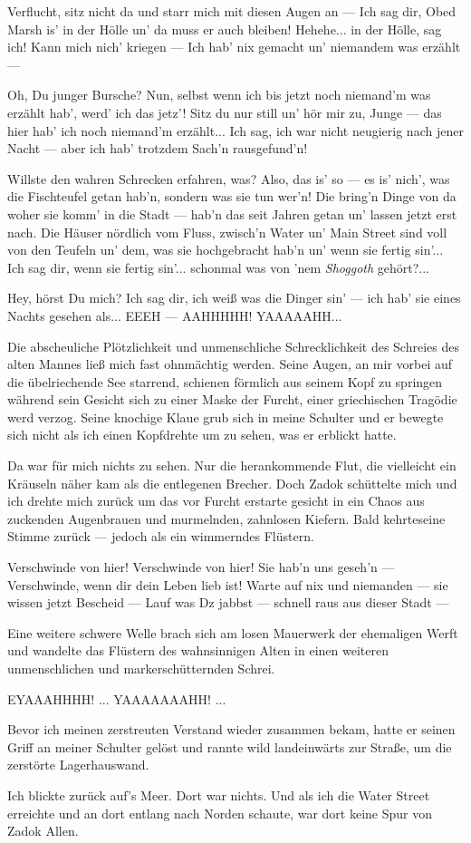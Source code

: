 \glqq Verflucht, sitz nicht da und starr mich mit diesen Augen an --- Ich sag dir, Obed Marsh is' in der Hölle un' da muss er auch bleiben! Hehehe... in der Hölle, sag ich! Kann mich nich' kriegen --- Ich hab' nix gemacht un' niemandem was erzählt ---

Oh, Du junger Bursche? Nun, selbst wenn ich bis jetzt noch niemand'm was erzählt hab', werd' ich das jetz'! Sitz du nur still un' hör mir zu, Junge --- das hier hab' ich noch niemand'm erzählt... Ich sag, ich war nicht neugierig nach jener Nacht --- aber ich hab' trotzdem Sach'n rausgefund'n!

Willste den wahren Schrecken erfahren, was? Also, das is' so --- es is' nich', was die Fischteufel getan hab'n, sondern was sie tun wer'n! Die bring'n Dinge von da woher sie komm' in die  Stadt --- hab'n das seit Jahren getan un' lassen jetzt erst nach. Die Häuser nördlich vom Fluss, zwisch'n Water un' Main Street sind voll von den Teufeln un' dem, was sie hochgebracht hab'n un' wenn sie fertig sin'... Ich sag dir, wenn sie fertig sin'... schonmal was von 'nem \textit{Shoggoth} gehört?...

Hey, hörst Du mich? Ich sag dir, ich weiß was die Dinger sin' --- ich hab' sie eines Nachts gesehen als... EEEH --- AAHHHHH! YAAAAAHH...
\grqq

Die abscheuliche Plötzlichkeit und unmenschliche Schrecklichkeit des Schreies des alten Mannes ließ mich fast ohnmächtig werden. Seine Augen, an mir vorbei auf die übelriechende See starrend, schienen förmlich aus seinem Kopf zu springen während sein Gesicht sich zu einer Maske der Furcht, einer griechischen Tragödie werd verzog. Seine knochige Klaue grub sich in meine Schulter und er bewegte sich nicht als ich einen Kopfdrehte um zu sehen, was er erblickt hatte.

Da war für mich nichts zu sehen. Nur die herankommende Flut, die vielleicht ein Kräuseln näher kam als die entlegenen Brecher. Doch Zadok schüttelte mich und ich drehte mich zurück um das vor Furcht erstarte gesicht in ein Chaos aus zuckenden Augenbrauen und murmelnden, zahnlosen Kiefern. Bald kehrteseine Stimme zurück --- jedoch als ein wimmerndes Flüstern.

\glqq Verschwinde von hier! Verschwinde von hier! Sie hab'n uns geseh'n --- Verschwinde, wenn dir dein Leben lieb ist! Warte auf nix und niemanden --- sie wissen jetzt Bescheid --- Lauf was Dz jabbst --- schnell raus aus dieser Stadt ---
\grqq

Eine weitere schwere Welle brach sich am losen Mauerwerk der ehemaligen Werft und wandelte das Flüstern des wahnsinnigen Alten in einen weiteren unmenschlichen und markerschütternden Schrei.

\glqq EYAAAHHHH! ... YAAAAAAAHH! ...\grqq

Bevor ich meinen zerstreuten Verstand wieder zusammen bekam, hatte er seinen Griff an meiner Schulter gelöst und rannte wild landeinwärts zur Straße, um die zerstörte Lagerhauswand.

Ich blickte zurück auf's Meer. Dort war nichts. Und als ich die Water Street erreichte und an dort entlang nach Norden schaute, war dort keine Spur von Zadok Allen.
